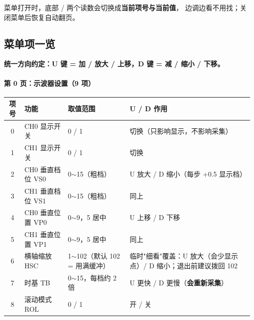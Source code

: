 \documentclass[UTF8,a4paper,11pt]{ctexart}
\begin{document}
\begin{tipbox}
菜单打开时，底部  /  两个读数会切换成\textbf{当前项号与当前值}，
边调边看不用找；关闭菜单后恢复自动翻页。
\end{tipbox}

\subsection{菜单项一览}

\textbf{统一方向约定：U 键 = 加 / 放大 / 上移，D 键 = 减 / 缩小 / 下移。}

\paragraph{第 0 页：示波器设置（9 项）}
\begin{center}
\small
\begin{tabular}{clll}
\toprule
项号 & 功能 & 取值范围 & U / D 作用\\
\midrule
0 & CH0 显示开关 & 0 / 1 & 切换（只影响显示，不影响采集）\\
1 & CH1 显示开关 & 0 / 1 & 切换\\
2 & CH0 垂直档位 VS0 & 0$\sim$15（粗档） & U 放大 / D 缩小（每步 +0.5 显示档）\\
3 & CH1 垂直档位 VS1 & 0$\sim$15（粗档） & 同上\\
4 & CH0 垂直位置 VP0 & 0$\sim$9，5 居中 & U 上移 / D 下移\\
5 & CH1 垂直位置 VP1 & 0$\sim$9，5 居中 & 同上\\
6 & 横轴缩放 HSC & 1$\sim$102（默认 102 = 用满缓冲） & 临时"细看"覆盖：U 放大（会少显示点）/ D 缩小；退出前建议拨回 102\\
7 & 时基 TB & 0$\sim$15，每档约 2 倍 & U 更快 / D 更慢（\textbf{会重新采集}）\\
8 & 滚动模式 ROL & 0 / 1 & 开 / 关\\
\bottomrule
\end{tabular}
\end{center}
\end{document}
